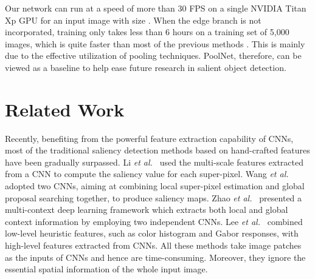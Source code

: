 \documentclass[10pt,twocolumn,letterpaper]{article}
\def\etal{{\em et al.~}}
\begin{document}
Our network can run at a speed of more than 30 FPS on a single NVIDIA Titan Xp GPU
for an input image with size .
When the edge branch is not incorporated, training only takes less than 6 hours 
on a training set of 5,000 images,
which is quite faster than most of the previous methods
\cite{liu2018picanet,zhang2018bi,luo2017non,zhang2017amulet,zhang2017learning,hou2016deeply}.
This is mainly due to the effective utilization of pooling techniques.
PoolNet, therefore, can be viewed as a baseline to help ease future research
in salient object detection.


\section{Related Work}



Recently, benefiting from the powerful feature extraction capability of CNNs, most of the traditional
saliency detection methods based on hand-crafted features 
\cite{cheng2015global,jiang2013salient,li2013saliency,perazzi2012saliency}
have been gradually surpassed.
Li \etal \cite{li2015visual} used the multi-scale features extracted from a CNN to 
compute the saliency value for each super-pixel.
Wang \etal \cite{wang2015deep} adopted two CNNs, aiming at combining
local super-pixel estimation and global proposal searching together, to produce saliency maps.
Zhao \etal \cite{zhao2015saliency} presented a multi-context deep learning framework which
extracts both local and global context information by employing two independent CNNs.
Lee \etal \cite{lee2016deep} combined low-level heuristic features, 
such as color histogram and Gabor responses, with high-level features extracted from CNNs.
All these methods take image patches as the inputs of CNNs and hence
are time-consuming.
Moreover, they ignore the essential spatial information of the whole input image.
\end{document}

